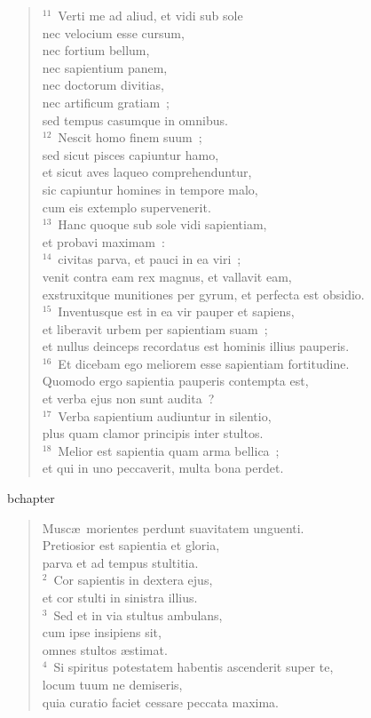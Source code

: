 \begin{verse}${}^{11}$~Verti me ad aliud, et vidi sub sole\\ nec velocium esse cursum,\\ nec fortium bellum,\\ nec sapientium panem,\\ nec doctorum divitias,\\ nec artificum gratiam~;\\ sed tempus casumque in omnibus.\\
${}^{12}$~Nescit homo finem suum~;\\ sed sicut pisces capiuntur hamo,\\ et sicut aves laqueo comprehenduntur,\\ sic capiuntur homines in tempore malo,\\ cum eis extemplo supervenerit.\\
${}^{13}$~Hanc quoque sub sole vidi sapientiam,\\ et probavi maximam~:\\
${}^{14}$~civitas parva, et pauci in ea viri~;\\ venit contra eam rex magnus, et vallavit eam,\\ exstruxitque munitiones per gyrum, et perfecta est obsidio.\\
${}^{15}$~Inventusque est in ea vir pauper et sapiens,\\ et liberavit urbem per sapientiam suam~;\\ et nullus deinceps recordatus est hominis illius pauperis.\\
${}^{16}$~Et dicebam ego meliorem esse sapientiam fortitudine.\\ Quomodo ergo sapientia pauperis contempta est,\\ et verba ejus non sunt audita~?\\
${}^{17}$~Verba sapientium audiuntur in silentio,\\ plus quam clamor principis inter stultos.\\
${}^{18}$~Melior est sapientia quam arma bellica~;\\ et qui in uno peccaverit, multa bona perdet.\end{verse}


bchapter\begin{verse}\vspace{-19pt}Musc\ae\ morientes perdunt suavitatem unguenti.\\ Pretiosior est sapientia et gloria,\\ parva et ad tempus stultitia.\\
${}^{2}$~Cor sapientis in dextera ejus,\\ et cor stulti in sinistra illius.\\
${}^{3}$~Sed et in via stultus ambulans,\\ cum ipse insipiens sit,\\ omnes stultos \ae stimat.\\
${}^{4}$~Si spiritus potestatem habentis ascenderit super te,\\ locum tuum ne demiseris,\\ quia curatio faciet cessare peccata maxima.\end{verse}


